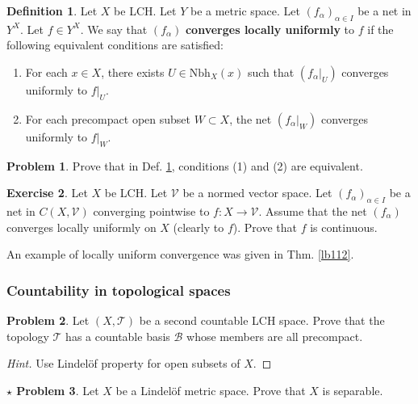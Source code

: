 \documentclass[12pt,b5paper,notitlepage]{article}
\theoremstyle{definition}
\newtheorem{df}{Definition}[section]
\newtheorem{exe}[df]{Exercise}
\newtheorem{prob}{\color{red}Problem}[section]
\newtheorem{sprob}[prob]{\color{red}$\star$ Problem}
\theoremstyle{plain}
\newcommand{\mc}{\mathcal}
\newcommand{\Nbh}{\mathrm{Nbh}}
\numberwithin{equation}{section}
\begin{document}
\begin{df}\label{lb334}
Let $X$ be LCH. Let $Y$ be a metric space. Let $(f_\alpha)_{\alpha\in I}$ be a net in $Y^X$. Let $f\in Y^X$.  We say that $(f_\alpha)$  \textbf{converges locally uniformly}  to $f$ if the following equivalent conditions are satisfied:
\begin{enumerate}[label=(\arabic*)]
\item For each $x\in X$, there exists $U\in\Nbh_X(x)$ such that $(f_\alpha|_U)$ converges uniformly to $f|_U$.
\item For each precompact open subset $W\subset X$, the net $(f_\alpha|_W)$ converges uniformly to $f|_W$.
\end{enumerate}
\end{df}

\begin{prob}
Prove that in Def. \ref{lb334}, conditions (1) and (2) are equivalent. 
\end{prob}


\begin{exe}
Let $X$ be LCH. Let $\mc V$ be a normed vector space. Let $(f_\alpha)_{\alpha\in I}$ be a net in $C(X,\mc V)$ converging pointwise to $f:X\rightarrow 
\mc V$. Assume that the net $(f_\alpha)$ converges locally uniformly on $X$ (clearly to $f$). Prove that $f$ is continuous. 
\end{exe}






An example of locally uniform convergence was given in Thm. \ref{lb112}.



\subsubsection{Countability in topological spaces}



\begin{prob}
Let $(X,\mc T)$ be a second countable LCH space. Prove that the topology $\mc T$ has a countable basis $\mc B$ whose members are all precompact.
\end{prob}

\begin{proof}[Hint]
Use Lindel\"of property for open subsets of $X$.
\end{proof}

\begin{sprob}\label{lb255}
Let $X$ be a Lindel\"of metric space. Prove that $X$ is separable. 
\end{sprob}
\end{document}
